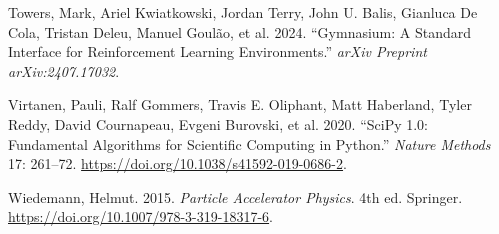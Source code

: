 \documentclass[
]{article}
\newlength{\cslhangindent}
\newlength{\cslentryspacingunit} %
\newenvironment{CSLReferences}[2] %
 {%
  \setlength{\parindent}{0pt}
  \ifodd #1
  \let\oldpar\par
  \def\par{\hangindent=\cslhangindent\oldpar}
  \fi
  \setlength{\parskip}{#2\cslentryspacingunit}
 }%
 {}
\begin{document}
\begin{CSLReferences}{1}{0}
\leavevmode{}%
Towers, Mark, Ariel Kwiatkowski, Jordan Terry, John U. Balis, Gianluca
De Cola, Tristan Deleu, Manuel Goulão, et al. 2024. {``Gymnasium: A
Standard Interface for Reinforcement Learning Environments.''}
\emph{arXiv Preprint arXiv:2407.17032}.

\leavevmode{}%
Virtanen, Pauli, Ralf Gommers, Travis E. Oliphant, Matt Haberland, Tyler
Reddy, David Cournapeau, Evgeni Burovski, et al. 2020. {``SciPy 1.0:
Fundamental Algorithms for Scientific Computing in Python.''}
\emph{Nature Methods} 17: 261--72.
\url{https://doi.org/10.1038/s41592-019-0686-2}.

\leavevmode{}%
Wiedemann, Helmut. 2015. \emph{Particle Accelerator Physics}. 4th ed.
Springer. \url{https://doi.org/10.1007/978-3-319-18317-6}.

\end{CSLReferences}
\end{document}
